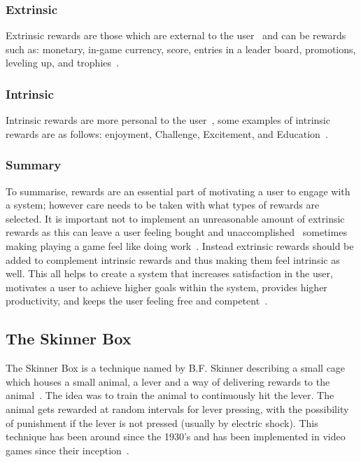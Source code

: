 \documentclass[a4paper,12pt]{article}
\begin{document}
\subsubsection{Extrinsic}\label{sec:extrinsic}
Extrinsic rewards are those which are external to the user~\citep{deci_extrinsic_2001,McGonigal:2011:RBW:1972527} and can be rewards such as: monetary,	in-game currency, score, entries in a leader board, promotions, leveling up, and trophies~\citep{bread-and-games}.

\subsubsection{Intrinsic}\label{sec:intrinsic}
Intrinsic rewards are more personal to the user~\citep{patient-education-and-training}, some examples of intrinsic rewards are as follows: enjoyment, Challenge, Excitement, and Education~\citep{bread-and-games}.

\subsubsection{Summary}
To summarise, rewards are an essential part of motivating a user to engage with a system; however care needs to be taken with what types of rewards are selected. It is important not to implement an unreasonable amount of extrinsic rewards as this can leave a user feeling bought and unaccomplished~\citep{openingSkinersBox,theSkinnerBox,McGonigal:2011:RBW:1972527,bread-and-games} sometimes making playing a game feel like doing work~\citep{turning-play-into-work}. Instead extrinsic rewards should be added to complement intrinsic rewards and thus making them feel intrinsic as well. This all helps to create a system that increases satisfaction in the user, motivates a user to achieve higher goals within the system, provides higher productivity, and keeps the user feeling free and competent~\citep{intrinsic-motivation}.

\subsection{The Skinner Box}
The Skinner Box is a technique named by B.F. Skinner describing a small cage which houses a small animal, a lever and a way of delivering rewards to the animal~\citep{openingSkinersBox}. The idea was to train the animal to continuously hit the lever. The animal gets rewarded at random intervals for lever pressing, with the possibility of punishment if the lever is not pressed (usually by electric shock). This technique has been around since the 1930’s and has been implemented in video games since their inception~\citep{theSkinnerBox}.
\end{document}
